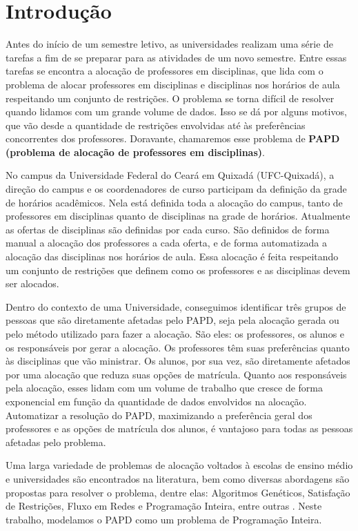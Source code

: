 \chapter{Introdução}
\label{introducao}

Antes do início de um semestre letivo, as universidades realizam uma série de tarefas a fim de se preparar para as atividades de um novo semestre. Entre essas tarefas se encontra a alocação de professores em disciplinas, que lida com o problema de alocar professores em disciplinas e disciplinas nos horários de aula respeitando um conjunto de restrições. O problema se torna difícil de resolver quando lidamos com um grande volume de dados. Isso se dá por alguns motivos, que vão desde a quantidade de restrições envolvidas até às preferências concorrentes dos professores. Doravante, chamaremos esse problema de \textbf{PAPD (problema de alocação de professores em disciplinas)}.

No campus da Universidade Federal do Ceará em Quixadá (UFC-Quixadá), a direção do campus e os coordenadores de curso participam da definição da grade de horários acadêmicos. Nela está definida toda a alocação do campus, tanto de professores em disciplinas quanto de disciplinas na grade de horários. Atualmente as ofertas de disciplinas são definidas por cada curso. São definidos de forma manual a alocação dos professores a cada oferta, e de forma automatizada a alocação das disciplinas nos horários de aula. Essa alocação é feita respeitando um conjunto de restrições que definem como os professores e as disciplinas devem ser alocados.

Dentro do contexto de uma Universidade, conseguimos identificar três grupos de pessoas que são diretamente afetadas pelo PAPD, seja pela alocação gerada ou pelo método utilizado para fazer a alocação. São eles: os professores, os alunos e os responsáveis por gerar a alocação. Os professores têm suas preferências quanto às disciplinas que vão ministrar. Os alunos, por sua vez, são diretamente afetados por uma alocação que reduza suas opções de matrícula. Quanto aos responsáveis pela alocação, esses lidam com um volume de trabalho que cresce de forma exponencial em função da quantidade de dados envolvidos na alocação. Automatizar a resolução do PAPD, maximizando a preferência geral dos professores e as opções de matrícula dos alunos, é vantajoso para todas as pessoas afetadas pelo problema.

Uma larga variedade de problemas de alocação voltados à escolas de ensino médio e universidades são encontrados na literatura, bem como diversas abordagens são propostas para resolver o problema, dentre elas: Algoritmos Genéticos, Satisfação de Restrições, Fluxo em Redes e Programação Inteira, entre outras \cite{schaerf1999survey}. Neste trabalho, modelamos o PAPD como um problema de Programação Inteira. 

